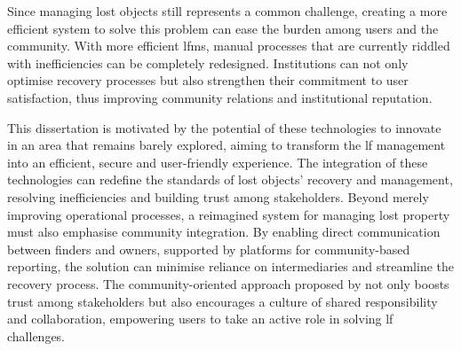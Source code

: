 Since managing lost objects still represents a common challenge, creating a more efficient system to solve this problem can ease the burden among users and the community. With more efficient \ac{lfms}, manual processes that are currently riddled with inefficiencies can be completely redesigned. Institutions can not only optimise recovery processes but also strengthen their commitment to user satisfaction, thus improving community relations and institutional reputation.


This dissertation is motivated by the potential of these technologies to innovate in an area that remains barely explored, aiming to transform the \ac{lf} management into an efficient, secure and user-friendly experience. The integration of these technologies can redefine the standards of lost objects' recovery and management, resolving inefficiencies and building trust among stakeholders. Beyond merely improving operational processes, a reimagined system for managing lost property must also emphasise community integration. By enabling direct communication between finders and owners, supported by platforms for community-based reporting, the solution can minimise reliance on intermediaries and streamline the recovery process. The community-oriented approach proposed by  not only boosts trust among stakeholders but also encourages a culture of shared responsibility and collaboration, empowering users to take an active role in solving \ac{lf} challenges.



